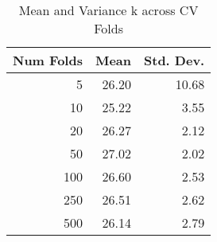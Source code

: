 \begin{table}[ht]
\centering
\begin{tabular}{rrr}
  \hline
Num Folds & Mean & Std. Dev. \\ 
  \hline
5 & 26.20 & 10.68 \\ 
  10 & 25.22 & 3.55 \\ 
  20 & 26.27 & 2.12 \\ 
  50 & 27.02 & 2.02 \\ 
  100 & 26.60 & 2.53 \\ 
  250 & 26.51 & 2.62 \\ 
  500 & 26.14 & 2.79 \\ 
   \hline
\end{tabular}
\caption{Mean and Variance k across CV Folds} 
\label{tab:cv_vars}
\end{table}
